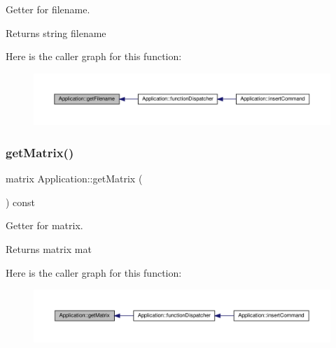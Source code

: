 Getter for filename. \begin{DoxyReturn}{Returns}
string filename 
\end{DoxyReturn}
Here is the caller graph for this function\+:
\nopagebreak
\begin{figure}[H]
\begin{center}
\leavevmode
\includegraphics[width=350pt]{class_application_a778575fb76de5352152d8928e1c3410f_icgraph}
\end{center}
\end{figure}
\mbox{\label{class_application_a67aeb617ca44a18045612d92f1d8afa0}} 
\subsubsection{\texorpdfstring{get\+Matrix()}{getMatrix()}}
{\footnotesize\ttfamily matrix Application\+::get\+Matrix (\begin{DoxyParamCaption}{ }\end{DoxyParamCaption}) const\hspace{0.3cm}{\ttfamily [inline]}}

Getter for matrix. \begin{DoxyReturn}{Returns}
matrix mat 
\end{DoxyReturn}
Here is the caller graph for this function\+:
\nopagebreak
\begin{figure}[H]
\begin{center}
\leavevmode
\includegraphics[width=350pt]{class_application_a67aeb617ca44a18045612d92f1d8afa0_icgraph}
\end{center}
\end{figure}
\mbox{\label{class_application_a2c6518d7f121299d9be8c66d31997fbc}} 
